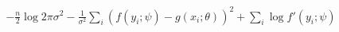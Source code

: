 \documentclass[10pt]{article}
\begin{document}
\begin{align*}-\frac{n}{2}\log{2\pi\sigma^2} 
- \frac{1}{\sigma^2}\sum_i \left(f\left(y_i;\psi\right) - g\left(x_i;\theta\right)\right)^2
+ \sum_i \log{f'\left(y_i;\psi\right)}
\end{align*}
\end{document}
